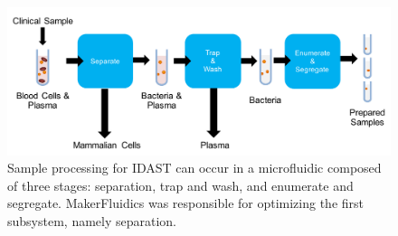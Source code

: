 \begin{figure}[h]
  \begin{minipage}[t]{0.99\linewidth}\centering
    \includegraphics[width=13cm]{idastUfFlow.pdf}
    \medskip
  \end{minipage}\hfill
  \caption[Block diagram of IDAST sample processing via microfluidics]{Sample processing for IDAST can occur in a microfluidic composed of three stages: separation, trap and wash, and enumerate and segregate. MakerFluidics was responsible for optimizing the first subsystem, namely separation.}
    \label{fig:idastUfFlow}
\end{figure}
